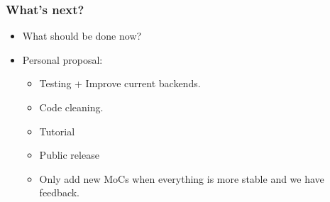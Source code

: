 \documentclass{beamer}
\begin{document}
\begin{frame}
  \frametitle{What's next?}
 \begin{itemize}
 \item What should be done now?
 \item Personal proposal:
  \begin{itemize}
   \item Testing + Improve current backends.  
   \item Code cleaning.
   \item Tutorial
   \item Public release
   \item Only add new MoCs when everything is more stable and we have feedback. 
   \end{itemize}
 \end{itemize}
\end{frame}
\end{document}
